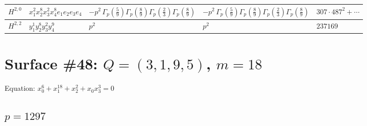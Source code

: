 \documentclass[11pt]{article}
\begin{document}
\begin{table}[ht]
{\begin{tabular}{@{}lllll@{}}
\midrule
$H^{2,0}$ & $x_{1}^{2} x_{2}^{8} x_{3}^{2} x_{4}^{8}  e_{1} e_{2} e_{3} e_{4}$ & $- p^{2} \, \Gamma_p \left( \frac{5}{9} \right) \Gamma_p \left( \frac{8}{9} \right) \Gamma_p \left( \frac{2}{3} \right) \Gamma_p \left( \frac{8}{9} \right)$ & $- p^{2} \, \Gamma_p \left( \frac{5}{9} \right) \Gamma_p \left( \frac{8}{9} \right) \Gamma_p \left( \frac{2}{3} \right) \Gamma_p \left( \frac{8}{9} \right)$ & $307{\cdot}487^{2}{+}\cdots$ \\
\midrule
$H^{2,2}$ & $y_{1}^{1} y_{2}^{8} y_{3}^{2} y_{4}^{9}$ & $p^{2} \,$ & $p^{2} \,$ & $237169$ \\
\bottomrule
\end{tabular}
}
\renewcommand{\arraystretch}{1.0}
\end{table}

\newpage

\section*{Surface \#48: $Q=(3, 1, 9, 5)$, $m=18$}

Equation: $x_0^{6} + x_1^{18} + x_2^{2} + x_0 x_3^{3} = 0$

\subsection*{$p = 1297$}
\end{document}
